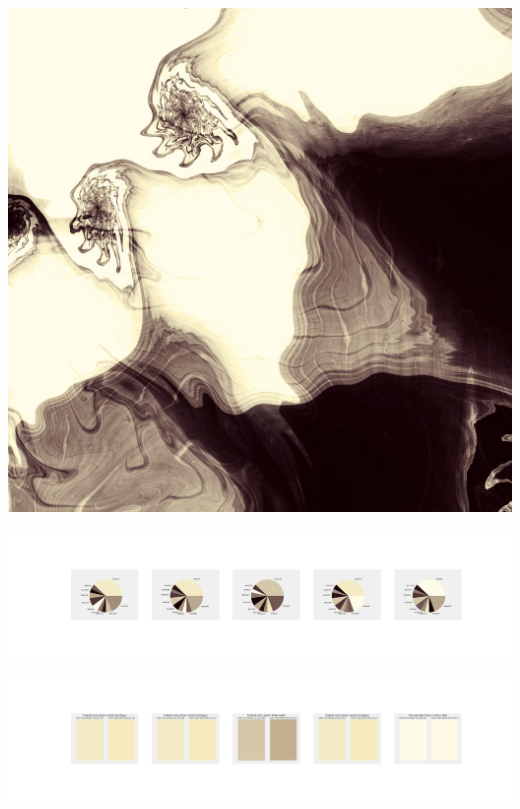 \documentclass[11pt]{article}
\begin{document}
\begin{landscape}
    \begin{center}
    \includegraphics[width=\textwidth]{./nbimg/file (383).jpg}
    \end{center}

    \begin{center}
    \includegraphics[width=250mm]{./nbimg/pie-315.jpg}
    \end{center}

    \begin{center}
    \includegraphics[width=250mm]{./nbimg/peak-315.jpg}
    \end{center}
    


\end{landscape}
\end{document}
